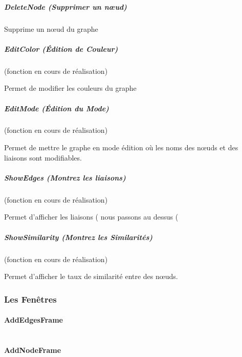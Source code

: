 \documentclass[french]{article}
\begin{document}
    \subparagraph{DeleteNode (Supprimer un nœud) \\}

      Supprime un nœud du graphe


    \subparagraph{EditColor (Édition de Couleur) \\} (fonction en cours de réalisation)

      Permet de modifier les couleurs du graphe


    \subparagraph{EditMode (Édition du Mode) \\} (fonction en cours de réalisation)

      Permet de mettre le graphe en mode édition où les noms des nœuds et
      des liaisons sont modifiables.


    \subparagraph{ShowEdges (Montrez les liaisons) \\} (fonction en cours de réalisation)

      Permet d'afficher les liaisons (%
      nous passons au dessus (%


    \subparagraph{ShowSimilarity (Montrez les Similarités) \\} (fonction en cours de réalisation)

      Permet d'afficher le taux de similarité entre des nœuds.


  \subsubsection*{Les Fenêtres}


    \paragraph{AddEdgesFrame \\ \\}

    
   
    \paragraph{AddNodeFrame \\ \\}
\end{document}
